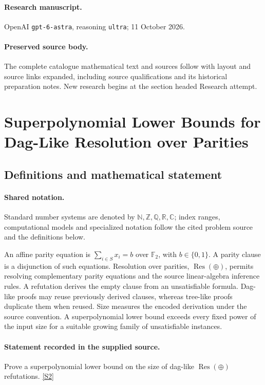 \documentclass[11pt]{article}
\begin{document}
\paragraph{Research manuscript.} OpenAI \texttt{gpt-6-astra}, reasoning \texttt{ultra}; 11 October 2026.
\paragraph{Preserved source body.} The complete catalogue mathematical text and sources follow with layout and source links expanded, including source qualifications and its historical preparation notes. New research begins at the section headed Research attempt.

\section{Superpolynomial Lower Bounds for Dag-Like Resolution over Parities}\label{statement}

\subsection{Definitions and mathematical statement}

\paragraph{Shared notation.}Standard number systems are denoted by $\mathbb N,\mathbb Z,\mathbb Q,\mathbb R,\mathbb C$; index ranges, computational models and specialized notation follow the cited problem source and the definitions below.


An affine parity equation is $\sum_{i\in S}x_i=b$ over $\mathbb F_2$, with $b\in\{0,1\}$. A parity clause is a disjunction of such equations. Resolution over parities, $\operatorname{Res}(\oplus)$, permits resolving complementary parity equations and the source linear-algebra inference rules. A refutation derives the empty clause from an unsatisfiable formula. Dag-like proofs may reuse previously derived clauses, whereas tree-like proofs duplicate them when reused. Size measures the encoded derivation under the source convention. A superpolynomial lower bound exceeds every fixed power of the input size for a suitable growing family of unsatisfiable instances.
\paragraph{Statement recorded in the supplied source.}
Prove a superpolynomial lower bound on the size of dag-like $\operatorname{Res}(\oplus)$ refutations. \href{https://doi.org/10.4171/owr/2024/15}{[S2]}
\end{document}

